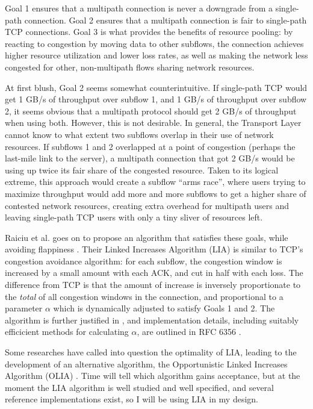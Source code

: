 Goal 1 ensures that a multipath connection is never a downgrade from a single-path connection. Goal 2 ensures that a multipath connection is fair to single-path TCP connections. Goal 3 is what provides the benefits of resource pooling: by reacting to congestion by moving data to other subflows, the connection achieves higher resource utilization and lower loss rates, as well as making the network less congested for other, non-multipath flows sharing network resources.

At first blush, Goal 2 seems somewhat counterintuitive. If single-path TCP would get 1 GB/s of throughput over subflow 1, and 1 GB/s of throughput over subflow 2, it seems obvious that a multipath protocol should get 2 GB/s of throughput when using both. However, this is not desirable. In general, the Transport Layer cannot know to what extent two subflows overlap in their use of network resources. If subflows 1 and 2 overlapped at a point of congestion (perhaps the last-mile link to the server), a multipath connection that got 2 GB/s would be using up twice its fair share of the congested resource. Taken to its logical extreme, this approach would create a subflow ``arms race'', where users trying to maximize throughput would add more and more subflows to get a higher share of contested network resources, creating extra overhead for multipath users and leaving single-path TCP users with only a tiny sliver of resources left.

Raiciu et al. goes on to propose an algorithm that satisfies these goals, while avoiding flappiness \cite{raiciu2009practical}. Their Linked Increases Algorithm (LIA) is similar to TCP's congestion avoidance algorithm: for each subflow, the congestion window is increased by a small amount with each ACK, and cut in half with each loss. The difference from TCP is that the amount of increase is inversely proportionate to the \emph{total} of all congestion windows in the connection, and proportional to a parameter $\alpha$ which is dynamically adjusted to satisfy Goals 1 and 2. The algorithm is further justified in \cite{wischik2011design}, and implementation details, including suitably efficicient methods for calculating $\alpha$, are outlined in RFC 6356 \cite{rfc6356}.

Some researches have called into question the optimality of LIA, leading to the development of an alternative algorithm, the Opportunistic Linked Increases Algorithm (OLIA) \cite{khalili2012optimal}. Time will tell which algorithm gains acceptance, but at the moment the LIA algorithm is well studied and well specified, and several reference implementations exist, so I will be using LIA in my design. 

